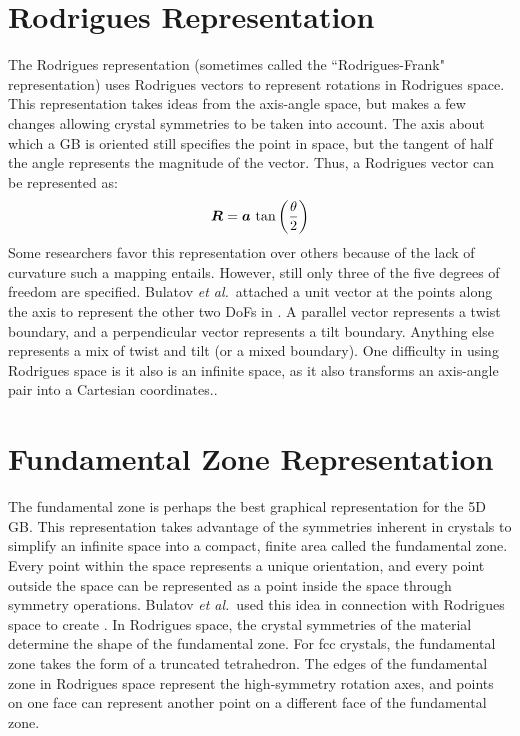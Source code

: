 \documentclass[twoside,senior]{BYUPhys}
\begin{document}
\section{Rodrigues Representation\label{GBReps:Rodrigues}}
The Rodrigues representation (sometimes called the ``Rodrigues-Frank" representation) uses Rodrigues vectors to represent rotations in Rodrigues space.  This representation takes ideas from the axis-angle space, but makes a few changes allowing crystal symmetries to be taken into account.  The axis about which a GB is oriented still specifies the point in space, but the tangent of half the angle represents the magnitude of the vector. Thus, a Rodrigues vector can be represented as:\cite{morawiec1996, becker1989, frank1988, randle2000, priester2013}
\begin{equation}
\bm{R}=\bm{a}\ \textnormal{tan}\left(\frac{\theta}{2}\right)
\label{eq:rodriguesVec}
\end{equation}
Some researchers favor this representation over others because of the lack of curvature such a mapping entails.\cite{frank1988, randle2000}  However, still only three of the five degrees of freedom are specified.  Bulatov \emph{et al.}\ attached a unit vector at the points along the axis to represent the other two DoFs in . A parallel vector represents a twist boundary, and a perpendicular vector represents a tilt boundary.  Anything else represents a mix of twist and tilt (or a mixed boundary).  One difficulty in using Rodrigues space is it also is an infinite space, as it also transforms an axis-angle pair into a Cartesian coordinates.\cite{frank1988, kirch2008}.

\section{Fundamental Zone Representation\label{GBReps:FunZone}}
The fundamental zone is perhaps the best graphical representation for the 5D GB.  This representation takes advantage of the symmetries inherent in crystals\cite{stokes2007} to simplify an infinite space into a compact, finite area called the fundamental zone.\cite{bulatov2014, patala2013, homer2015, morawiec1996, patala2012}  Every point within the space represents a unique orientation, and every point outside the space can be represented as a point inside the space through symmetry operations.\cite{morawiec1996, becker1989, frank1988}  Bulatov \emph{et al.}\ used this idea in connection with Rodrigues space to create .  In Rodrigues space, the crystal symmetries of the material determine the shape of the fundamental zone.\cite{patala2013, morawiec1996}  For fcc crystals, the fundamental zone takes the form of a truncated tetrahedron.\cite{bulatov2014}  The edges of the fundamental zone in Rodrigues space represent the high-symmetry rotation axes, and points on one face can represent another point on a different face of the fundamental zone.  
\end{document}
